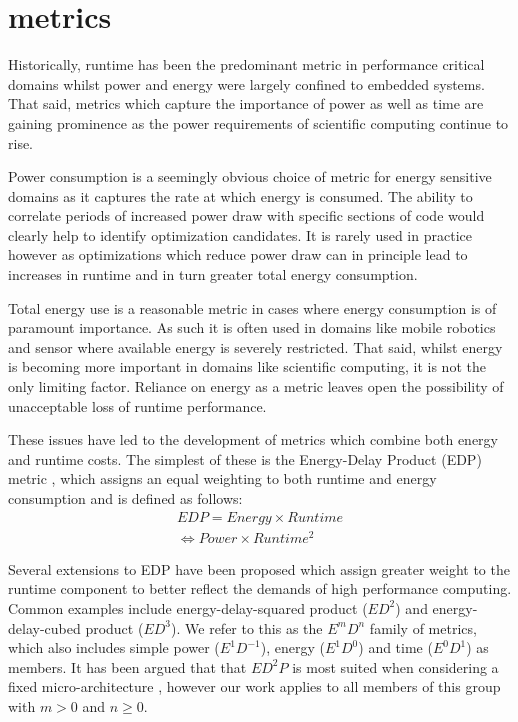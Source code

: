 \section{metrics}
\label{sec:metrics}
Historically, runtime has been the predominant metric in performance critical domains whilst power and energy were largely confined to embedded systems.
That said, metrics which capture the importance of power as well as time are gaining prominence as the power requirements of scientific computing continue to rise.

Power consumption is a seemingly obvious choice of metric for energy sensitive domains as it captures the rate at which energy is consumed.
The ability to correlate periods of increased power draw with specific sections of code would clearly help to identify optimization candidates.
It is rarely used in practice however as optimizations which reduce power draw can in principle lead to increases in runtime and in turn greater total energy consumption.

Total energy use is a reasonable metric in cases where energy consumption is of paramount importance.
As such it is often used in domains like mobile robotics and sensor where available energy is severely restricted.
That said, whilst energy is becoming more important in domains like scientific computing, it is not the only limiting factor. 
Reliance on energy as a metric leaves open the possibility of unacceptable loss of runtime performance.

These issues have led to the development of metrics which combine both energy and runtime costs.
The simplest of these is the Energy-Delay Product (EDP) metric \cite{gonzales:1995aa}, which assigns an equal weighting to both runtime and energy consumption and is defined as follows:
\begin{align}
  EDP = Energy \times Runtime \nonumber \\
      \Leftrightarrow Power \times Runtime^{2} 
  \label{eq:edp}
\end{align}

Several extensions to EDP have been proposed which assign greater weight to the runtime component to better reflect the demands of high performance computing.
Common examples include energy-delay-squared product ($ED^{2}$) and energy-delay-cubed product ($ED^{3}$).
We refer to this as the $E^mD^n$ family of metrics, which also includes simple power ($E^1D^{-1}$), energy ($E^1D^0$) and time ($E^0D^1$) as members.
It has been argued that that $ED^{2}P$ is most suited when considering a fixed micro-architecture \cite{brooks:2000aa},  however our work applies to all members of this group with $m > 0$ and $n \geq 0$.
